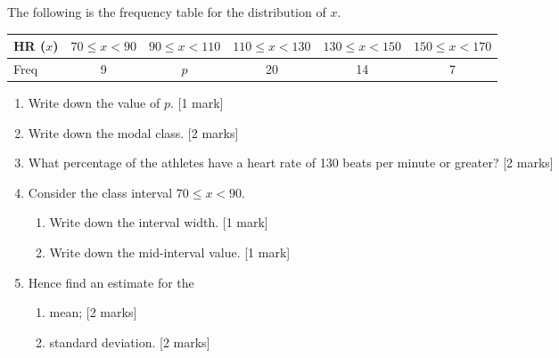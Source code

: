 \documentclass[12pt, twoside]{article}
\begin{document}
\begin{enumerate}
    \begin{center}
    \end{center}

    The following is the frequency table for the distribution of $x$. \\[0.25cm]
      \begin{tabular}{|l|c|c|c|c|c|}
        \hline
        HR ($x$) & $70 \leq x < 90$ & $90 \leq x < 110$ & $110 \leq x < 130$ & $130 \leq x < 150$ & $150 \leq x < 170$ \\ 
        \hline 
        Freq & 9 & $p$ & 20 & 14 & 7  \\ 
        \hline 
        \end{tabular}
      \begin{enumerate}
        \item Write down the value of $p$. \hfill [1 mark] \vspace{1cm}
        \item Write down the modal class. \hfill [2 marks] \vspace{1cm}
        \item What percentage of the athletes have a heart rate of 130 beats per minute or greater? \hfill [2 marks] \vspace{1cm}
        \item Consider the class interval $70 \leq x < 90$.
        \begin{enumerate}
          \item Write down the interval width. \hfill [1 mark] \vspace{1cm}
          \item Write down the mid-interval value. \hfill [1 mark] 
        \end{enumerate}
        \item Hence find an estimate for the
        \begin{enumerate}
          \item mean; \hfill [2 marks] \vspace{1cm}
          \item standard deviation. \hfill [2 marks] 
        \end{enumerate}
      \end{enumerate}

\end{enumerate}
\end{document}
